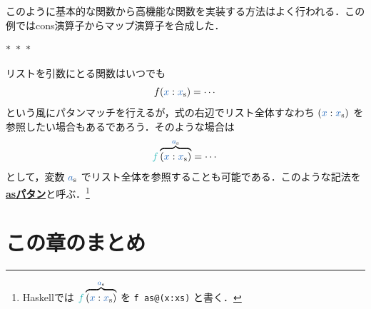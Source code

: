 \documentclass[a5paper,twoside,fleqn,draft]{jsbook}
\def\varColor{NavyBlue}
\def\funcColor{BlueGreen}
\newcommand{\separator}{\begin{center}$*$~$*$~$*$\end{center}}
\newcommand{\programminglanguage}[1]{\textsf{#1}}
\newcommand{\haskell}{\programminglanguage{Haskell}}
\newcommand{\keyword}[1]{{\underline{\textbf{#1}}}}
\newcommand{\code}[1]{\texttt{#1}}
\newcommand{\mVar}[1]{\textcolor{\varColor}{#1}}
\newcommand{\mXVar}{\mVar{x}}
\newcommand{\mFunc}[1]{\textcolor{\funcColor}{#1}}
\newcommand{\mFFunc}{{\mFunc{f}}}
\newcommand{\mList}[1]{\mVar{#1}_\mathrm{s}}
\newcommand{\mAs}[2]{\overbrace{(#1)}^{#2}}
\begin{document}
このように基本的な関数から高機能な関数を実装する方法はよく行われる．この例ではcons演算子からマップ演算子を合成した．

\separator

リストを引数にとる関数はいつでも
\begin{equation}
  f(\mXVar:\mList{x})
  =\dotsb
\end{equation}
という風にパタンマッチを行えるが，式の右辺でリスト全体すなわち $(\mXVar:\mList{x})$ を参照したい場合もあるであろう．そのような場合は
\begin{equation}
  \mFFunc\mAs{\mXVar:\mList{x}}{\mList{a}}%
  =\dotsb
\end{equation}
として，変数 $\mList{a}$ でリスト全体を参照することも可能である．このような記法を\keyword{asパタン}と呼ぶ．\footnote{\haskell では $\mFFunc\mAs{\mXVar:\mList{x}}{\mList{a}}$ を \code{f as@(x:xs)} と書く．}

\section{この章のまとめ}
\end{document}
